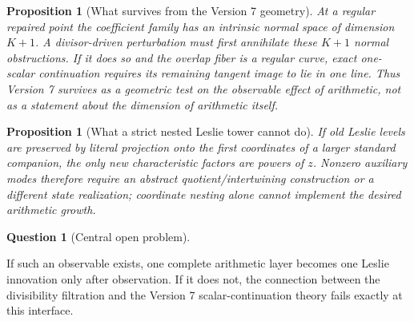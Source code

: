 \documentclass[11pt]{amsart}
\numberwithin{equation}{section}
\theoremstyle{plain}
\newtheorem{proposition}[theorem]{Proposition}
\theoremstyle{definition}
\newtheorem{question}[theorem]{Question}
\theoremstyle{remark}
\begin{document}
\begin{proposition}[What survives from the Version 7 geometry]
\label{prop:v9_surviving_geometry}
At a regular repaired point the coefficient family has an intrinsic normal space of dimension
$K+1$.  A divisor-driven perturbation must first annihilate these $K+1$ normal obstructions.  If
it does so and the overlap fiber is a regular curve, exact one-scalar continuation requires its
remaining tangent image to lie in one line.  Thus Version 7 survives as a geometric test on the
\emph{observable effect} of arithmetic, not as a statement about the dimension of arithmetic
itself.
\end{proposition}

\begin{proposition}[What a strict nested Leslie tower cannot do]
\label{prop:v9_coordinate_tower_summary}
If old Leslie levels are preserved by literal projection onto the first coordinates of a larger
standard companion, the only new characteristic factors are powers of $z$.  Nonzero auxiliary
modes therefore require an abstract quotient/intertwining construction or a different state
realization; coordinate nesting alone cannot implement the desired arithmetic growth.
\end{proposition}

\begin{question}[Central open problem]
\label{q:v9_central_open_problem}
\begin{center}
\end{center}
If such an observable exists, one complete arithmetic layer becomes one Leslie innovation only
after observation.  If it does not, the connection between the divisibility filtration and the
Version 7 scalar-continuation theory fails exactly at this interface.
\end{question}
\end{document}
